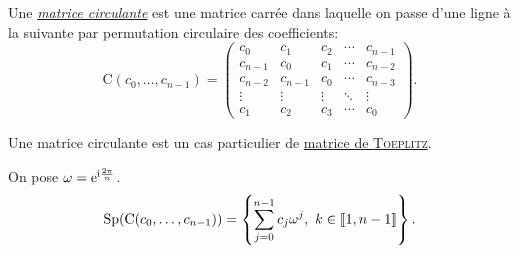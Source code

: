\begin{tcolorbox}
Une \href{https://fr.wikipedia.org/wiki/Matrice_circulante}{\emph{matrice circulante}} est une matrice carrée dans laquelle on passe d'une ligne à la suivante par permutation circulaire des coefficients:
$$
\mathrm{C}(c_0, \dots, c_{n-1})=
\begin{pmatrix}
c_0 & c_1 & c_2 & \cdots & c_{n-1} \\
c_{n-1} & c_0 & c_1 & \cdots & c_{n-2} \\
c_{n-2} & c_{n-1} & c_0 & \cdots & c_{n-3} \\
\vdots & \vdots & \vdots & \ddots & \vdots \\
c_1 & c_2 & c_3 & \cdots & c_0
\end{pmatrix}.
$$
\end{tcolorbox}

\begin{remarque}
    Une matrice circulante est un cas particulier de \href{https://fr.wikipedia.org/wiki/Matrice_de_Toeplitz}{matrice de \textsc{Toeplitz}}.
\end{remarque}

\begin{prop}
On pose $\omega = \mathrm{e}^{\mathrm{i} \frac{2 \pi}{n}}$.
    $$\mathrm{Sp}(\mathrm{C}(c_0, \dots, c_{n-1})) = \left \{ \sum_{j=0}^{n-1} c_j \omega^j,\ k \in \llbracket 1, n-1 \rrbracket \right \}.$$
\end{prop}

